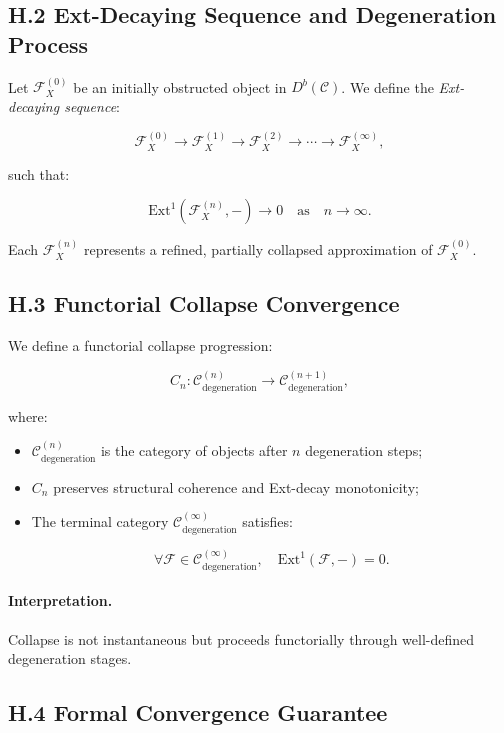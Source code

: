\documentclass[11pt]{article}
\begin{document}
\subsection*{H.2 Ext-Decaying Sequence and Degeneration Process}

Let \( \mathcal{F}_X^{(0)} \) be an initially obstructed object in \( D^b(\mathcal{C}) \). We define the \emph{Ext-decaying sequence}:

\[
\mathcal{F}_X^{(0)} \longrightarrow \mathcal{F}_X^{(1)} \longrightarrow \mathcal{F}_X^{(2)} \longrightarrow \cdots \longrightarrow \mathcal{F}_X^{(\infty)},
\]

such that:

\[
\mathrm{Ext}^1\left( \mathcal{F}_X^{(n)}, - \right) \to 0 \quad \text{as} \quad n \to \infty.
\]

Each \( \mathcal{F}_X^{(n)} \) represents a refined, partially collapsed approximation of \( \mathcal{F}_X^{(0)} \).

\subsection*{H.3 Functorial Collapse Convergence}

We define a functorial collapse progression:

\[
C_n : \mathcal{C}_{\mathrm{degeneration}}^{(n)} \longrightarrow \mathcal{C}_{\mathrm{degeneration}}^{(n+1)},
\]

where:

\begin{itemize}
    \item \( \mathcal{C}_{\mathrm{degeneration}}^{(n)} \) is the category of objects after \( n \) degeneration steps;
    \item \( C_n \) preserves structural coherence and Ext-decay monotonicity;
    \item The terminal category \( \mathcal{C}_{\mathrm{degeneration}}^{(\infty)} \) satisfies:

\[
\forall \mathcal{F} \in \mathcal{C}_{\mathrm{degeneration}}^{(\infty)}, \quad \mathrm{Ext}^1(\mathcal{F}, -) = 0.
\]
\end{itemize}

\paragraph{Interpretation.}
Collapse is not instantaneous but proceeds functorially through well-defined degeneration stages.

\subsection*{H.4 Formal Convergence Guarantee}
\end{document}
